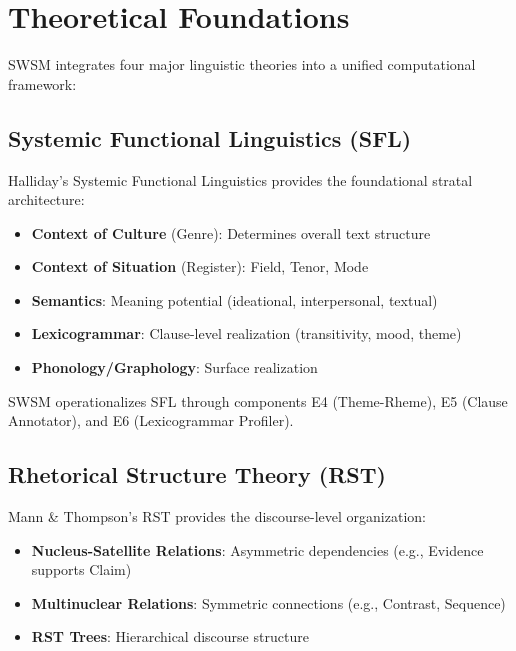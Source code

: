 
\section{Theoretical Foundations}
\label{sec:sw-theory}

SWSM integrates four major linguistic theories into a unified computational framework:

\subsection{Systemic Functional Linguistics (SFL)}
\label{sec:sw-sfl}

Halliday's Systemic Functional Linguistics \citep{halliday2014introduction} provides the foundational stratal architecture:

\begin{itemize}
    \item \textbf{Context of Culture} (Genre): Determines overall text structure
    \item \textbf{Context of Situation} (Register): Field, Tenor, Mode
    \item \textbf{Semantics}: Meaning potential (ideational, interpersonal, textual)
    \item \textbf{Lexicogrammar}: Clause-level realization (transitivity, mood, theme)
    \item \textbf{Phonology/Graphology}: Surface realization
\end{itemize}

SWSM operationalizes SFL through components E4 (Theme-Rheme), E5 (Clause Annotator), and E6 (Lexicogrammar Profiler).

\subsection{Rhetorical Structure Theory (RST)}
\label{sec:sw-rst}

Mann \& Thompson's RST \citep{mann1988rhetorical} provides the discourse-level organization:

\begin{itemize}
    \item \textbf{Nucleus-Satellite Relations}: Asymmetric dependencies (e.g., Evidence supports Claim)
    \item \textbf{Multinuclear Relations}: Symmetric connections (e.g., Contrast, Sequence)
    \item \textbf{RST Trees}: Hierarchical discourse structure
\end{itemize}

